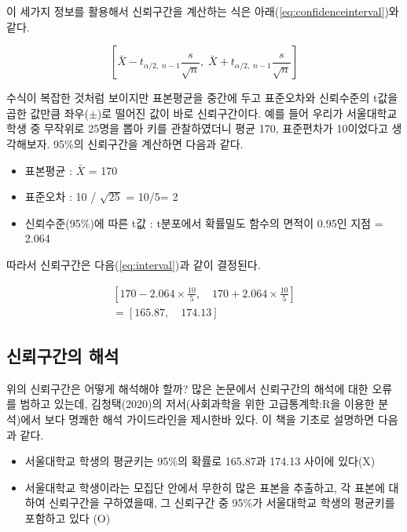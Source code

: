\documentclass[
]{book}
\providecommand{\tightlist}{%
  \setlength{\itemsep}{0pt}\setlength{\parskip}{0pt}}
\begin{document}
이 세가지 정보를 활용해서 신뢰구간을 계산하는 식은 아래(\eqref{eq:confidenceinterval})와 같다.

\begin{equation}
\left[
\bar{X}
-
t_{\alpha/2,\;n-1}
\frac{s}{\sqrt{n}},
\;
\bar{X}
+
t_{\alpha/2,\;n-1}
\frac{s}{\sqrt{n}}
\right]
\label{eq:confidenceinterval}
\end{equation}

수식이 복잡한 것처럼 보이지만 표본평균을 중간에 두고 표준오차와 신뢰수준의 t값을 곱한 값만큼 좌우(\(\pm\))로 떨어진 값이 바로 신뢰구간이다. 예를 들어 우리가 서울대학교 학생 중 무작위로 25명을 뽑아 키를 관찰하였더니 평균 170, 표준편차가 10이었다고 생각해보자. 95\%의 신뢰구간을 계산하면 다음과 같다.

\begin{itemize}
\tightlist
\item
  표본평균 : \(\bar{X}\) = 170
\item
  표준오차 : 10 / \(\sqrt{25}\) = 10/5= 2
\item
  신뢰수준(95\%)에 따른 t값 : t분포에서 확률밀도 함수의 면적이 0.95인 지점 = 2.064
\end{itemize}

따라서 신뢰구간은 다음(\eqref{eq:interval})과 같이 결정된다.

\begin{equation}
\begin{array}{cl}
\left [ 170-2.064\times \frac{10}{5}, \quad  170+2.064\times \frac{10}{5} \right ] 
\\
=\left [ 165.87, \quad 174.13 \right ]
\end{array}
\label{eq:interval}
\end{equation}

\subsection{신뢰구간의 해석}\label{uxc2e0uxb8b0uxad6cuxac04uxc758-uxd574uxc11d}

위의 신뢰구간은 어떻게 해석해야 할까? 많은 논문에서 신뢰구간의 해석에 대한 오류를 범하고 있는데, 김청택(2020)의 저서(사회과학을 위한 고급통계학:R을 이용한 분석)에서 보다 명쾌한 해석 가이드라인을 제시한바 있다. 이 책을 기초로 설명하면 다음과 같다.

\begin{itemize}
\tightlist
\item
  서울대학교 학생의 평균키는 95\%의 확률로 165.87과 174.13 사이에 있다(X)
\item
  서울대학교 학생이라는 모집단 안에서 무한히 많은 표본을 추출하고, 각 표본에 대하여 신뢰구간을 구하였을때, 그 신뢰구간 중 95\%가 서울대학교 학생의 평균키를 포함하고 있다 (O)
\end{itemize}
\end{document}

